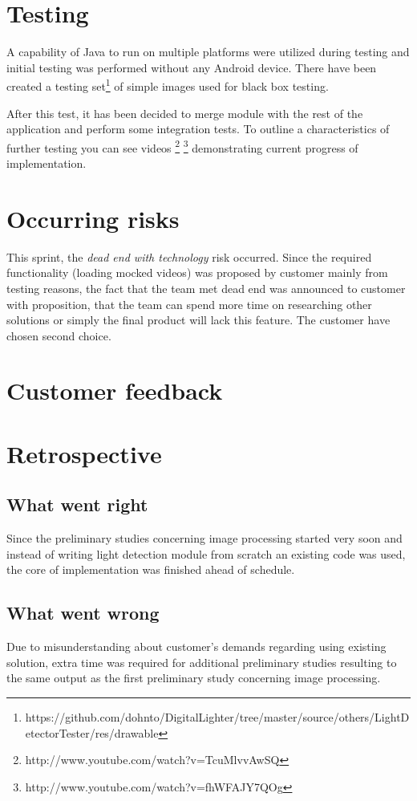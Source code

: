 \section{Testing}
A capability of Java to run on multiple platforms were utilized during testing and initial testing was performed without any Android device.
There have been created a testing set\footnote{https://github.com/dohnto/DigitalLighter/tree/master/source/others/LightDetectorTester/res/drawable} of simple images used for black box testing.

After this test, it has been decided to merge module with the rest of the application and perform some integration tests.
To outline a characteristics of further testing you can see videos \footnote{http://www.youtube.com/watch?v=TcuMlvvAwSQ} \footnote{http://www.youtube.com/watch?v=fhWFAJY7QOg} demonstrating current progress of implementation.

\section{Occurring risks}
This sprint, the \emph{dead end with technology} risk occurred. 
Since the required functionality (loading mocked videos) was proposed by customer mainly from testing reasons, the fact that the team met dead end was announced to customer with proposition, that the team can spend more time on researching other solutions or simply the final product will lack this feature.
The customer have chosen second choice.

\section{Customer feedback}

\section{Retrospective}
\subsection{What went right}
Since the preliminary studies concerning image processing started very soon and instead of writing light detection module from scratch an existing code was used, the core of implementation was finished ahead of schedule.

\subsection{What went wrong}
Due to misunderstanding about customer's demands regarding using existing solution, extra time was required for additional preliminary studies resulting to the same output as the first preliminary study concerning image processing. 

